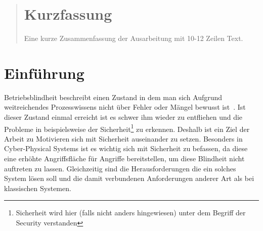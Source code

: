 \documentclass[final,bibliography=totocnumbered]{include/sikseminar}
\begin{document}
\makeTitle

\makeAuthor

\date{Datum des Vortrags \todo}

\subject{Seminar Cyber-Physical Systems}

\maketitle

\begin{abstract}
\section*{Kurzfassung}
Eine kurze Zusammenfassung der Ausarbeitung mit 10-12 Zeilen Text.
\end{abstract}
\thispagestyle{empty}
\newpage
\tableofcontents
\newpage

\section{Einführung}\label{sec:intro}
Betriebsblindheit beschreibt einen Zustand in dem man sich Aufgrund weitreichendes Prozesswissens nicht über Fehler oder Mängel bewusst ist~\cite[S.~202]{GK16}.
Ist dieser Zustand einmal erreicht ist es schwer ihm wieder zu entfliehen und die Probleme in beispielsweise der Sicherheit\footnote{Sicherheit wird hier (falls nicht anders hingewiesen) unter dem Begriff der Security verstanden} zu erkennen.
Deshalb ist ein Ziel der Arbeit zu Motivieren sich mit Sicherheit auseinander zu setzen.
Besonders in Cyber-Physical Systems ist es wichtig sich mit Sicherheit zu befassen, da diese eine erhöhte Angriffsfläche für Angriffe bereitstellen, um diese Blindheit nicht auftreten zu lassen.
Gleichzeitig sind die Herausforderungen die ein solches System lösen soll und die damit verbundenen Anforderungen anderer Art als bei klassischen Systemen.
\end{document}
